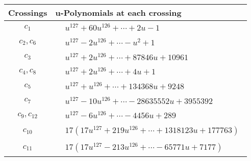 \documentclass[1p]{elsarticle_modified}
\theoremstyle{definition}
\begin{document}
\begin{tabular}{m{50pt}|m{274pt}}
Crossings & \hspace{64pt}u-Polynomials at each crossing \\
\hline $$\begin{aligned}c_{1}\end{aligned}$$&$\begin{aligned}
&u^{127}+60 u^{126}+\cdots+2 u-1
\end{aligned}$\\
\hline $$\begin{aligned}c_{2},c_{6}\end{aligned}$$&$\begin{aligned}
&u^{127}-2 u^{126}+\cdots- u^2+1
\end{aligned}$\\
\hline $$\begin{aligned}c_{3}\end{aligned}$$&$\begin{aligned}
&u^{127}+2 u^{126}+\cdots+87846 u+10961
\end{aligned}$\\
\hline $$\begin{aligned}c_{4},c_{8}\end{aligned}$$&$\begin{aligned}
&u^{127}+2 u^{126}+\cdots+4 u+1
\end{aligned}$\\
\hline $$\begin{aligned}c_{5}\end{aligned}$$&$\begin{aligned}
&u^{127}+u^{126}+\cdots+134368 u+9248
\end{aligned}$\\
\hline $$\begin{aligned}c_{7}\end{aligned}$$&$\begin{aligned}
&u^{127}-10 u^{126}+\cdots-28635552 u+3955392
\end{aligned}$\\
\hline $$\begin{aligned}c_{9},c_{12}\end{aligned}$$&$\begin{aligned}
&u^{127}-6 u^{126}+\cdots-4456 u+289
\end{aligned}$\\
\hline $$\begin{aligned}c_{10}\end{aligned}$$&$\begin{aligned}
&17(17 u^{127}+219 u^{126}+\cdots+1318123 u+177763)
\end{aligned}$\\
\hline $$\begin{aligned}c_{11}\end{aligned}$$&$\begin{aligned}
&17(17 u^{127}-213 u^{126}+\cdots-65771 u+7177)
\end{aligned}$\\
\hline
\end{tabular}\\~\\
\end{document}
